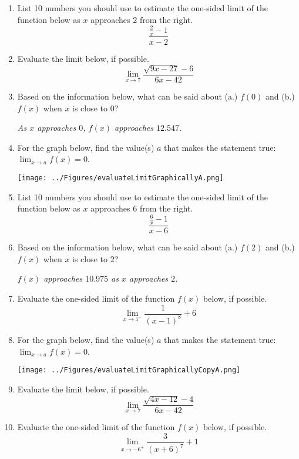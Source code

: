 \documentclass[14pt]{extbook}
\begin{document}
\begin{enumerate}
\item{
List 10 numbers you should use to estimate the one-sided limit of the function below as $x$ approaches 2 from the right.\[ \frac{\frac{2}{x} - 1}{x - 2} \]} \newpage
\item{
Evaluate the limit below, if possible.\[ \lim_{x \rightarrow 7} \frac{\sqrt{9x - 27} - 6}{6x - 42} \]} \newpage
\item{
Based on the information below, what can be said about (a.) $f(0)$ and (b.) $f(x)$ when $x$ is close to $0$?
\begin{center}
    \textit{ As $x$ approaches $0$, $f(x)$ approaches $12.547$. }
\end{center}
} \newpage
\item{
For the graph below, find the value(s) $a$ that makes the statement true: $ \displaystyle \lim_{x \rightarrow a} f(x) = 0$.
\begin{center}
    \texttt{[image: ../Figures/evaluateLimitGraphicallyA.png]}
\end{center}
} \newpage
\item{
List 10 numbers you should use to estimate the one-sided limit of the function below as $x$ approaches 6 from the right.\[ \frac{\frac{6}{x} - 1}{x - 6} \]} \newpage
\item{
Based on the information below, what can be said about (a.) $f(2)$ and (b.) $f(x)$ when $x$ is close to $2$?
\begin{center}
    \textit{ $f(x)$ approaches $10.975$ as $x$ approaches $2$. }
\end{center}
} \newpage
\item{
Evaluate the one-sided limit of the function $f(x)$ below, if possible.\[ \lim_{x \rightarrow 1^-} \frac{1}{(x-1)^8}+6 \]} \newpage
\item{
For the graph below, find the value(s) $a$ that makes the statement true: $ \displaystyle \lim_{x \rightarrow a} f(x) = 0$.
\begin{center}
    \texttt{[image: ../Figures/evaluateLimitGraphicallyCopyA.png]}
\end{center}
} \newpage
\item{
Evaluate the limit below, if possible.\[ \lim_{x \rightarrow 7} \frac{\sqrt{4x - 12} - 4}{6x - 42} \]} \newpage
\item{
Evaluate the one-sided limit of the function $f(x)$ below, if possible.\[ \lim_{x \rightarrow -6^+} \frac{3}{(x+6)^7}+1 \]} \newpage
\end{enumerate}
\end{document}
